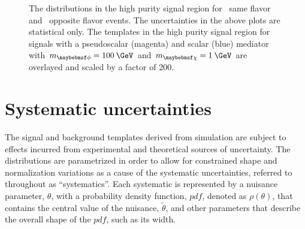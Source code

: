 \begin{figure}[h!]
  \caption{The \ptmiss distributions in the high purity signal region for~\protect{} same flavor and~\protect{} opposite flavor events. The uncertainties in the above plots are statistical only. The \ptmiss templates in the high purity signal region for signals with a pseudoscalar (magenta) and scalar (blue) mediator with $\mMed=100\:\GeV$ and $\mDM=1\:\GeV$ are overlayed and scaled by a factor of 200.}
  \label{fig:methi}
\end{figure}


\section{Systematic uncertainties}
\label{sec:systunc}

The signal and background \ptmiss templates derived from simulation are subject to effects incurred from experimental and theoretical sources of uncertainty. The \ptmiss distributions are parametrized in order to allow for constrained shape and normalization variations as a cause of the systematic uncertainties, referred to throughout as ``systematics''. Each systematic is represented by a nuisance parameter, $\theta$, with a probability density function, $pdf$, denoted as $\rho(\theta)$, that contains the central value of the nuisance, $\widetilde{\theta}$, and other parameters that describe the overall shape of the $pdf$, such as its width. 

